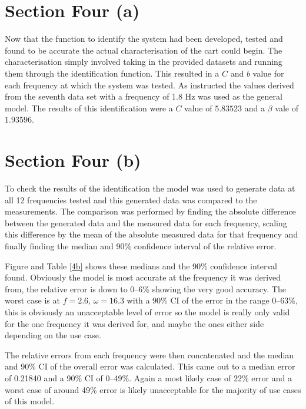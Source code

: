 \section*{Section Four (a)}

Now that the function to identify the system had been developed, tested and
found to be accurate the actual characterisation of the cart could begin.  The
characterisation simply involved taking in the provided datasets and running them
through the identification function.  This resulted in a $C$ and $b$ value for
each frequency at which the system was tested.  As instructed the values derived
from the seventh data set with a frequency of 1.8 Hz was used as the general
model.  The results of this identification were a $C$ value of $5.83523$ and a
$\beta$ vale of $1.93596$.

\section*{Section Four (b)}

To check the results of the identification the model was used to generate data
at all 12 frequencies tested and this generated data was compared to the
measurements.  The comparison was performed by finding the absolute difference
between the generated data and the measured data for each frequency, scaling
this difference by the mean of the absolute measured data for that frequency and
finally finding the median and 90\% confidence interval of the relative error.

Figure and Table \ref{4b} shows these medians and the 90\% confidence interval
found.  Obviously the model is most accurate at the frequency it was derived
from, the relative error is down to 0--6\% showing the very good accuracy.  The
worst case is at $f = 2.6$, $\omega = 16.3$ with a 90\% CI of the error in the
range 0--63\%, this is obviously an unacceptable level of error so the model is
really only valid for the one frequency it was derived for, and maybe the ones
either side depending on the use case.

The relative errors from each frequency were then concatenated and the median
and 90\% CI of the overall error was calculated.  This came out to a median
error of 0.21840 and a 90\% CI of 0--49\%.  Again a most likely case of 22\%
error and a worst case of around 49\% error is likely unacceptable for the
majority of use cases of this model.


